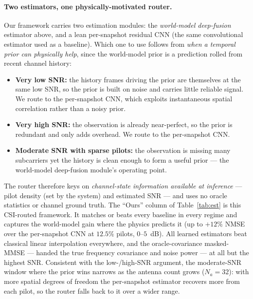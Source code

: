 \documentclass[11pt]{article}
\begin{document}
\paragraph{Two estimators, one physically-motivated router.}
Our framework carries two estimation modules: the \emph{world-model deep-fusion} estimator above, and
a lean per-snapshot residual CNN (the same convolutional estimator used as a baseline). Which one to
use follows from \emph{when a temporal prior can physically help}, since the world-model prior is a
prediction rolled from recent channel history:
\begin{itemize}[leftmargin=1.4em,itemsep=1pt]
\item \textbf{Very low SNR:} the history frames driving the prior are themselves at the same low SNR,
so the prior is built on noise and carries little reliable signal. We route to the per-snapshot CNN,
which exploits instantaneous spatial correlation rather than a noisy prior.
\item \textbf{Very high SNR:} the observation is already near-perfect, so the prior is redundant and
only adds overhead. We route to the per-snapshot CNN.
\item \textbf{Moderate SNR with sparse pilots:} the observation is missing many subcarriers yet the
history is clean enough to form a useful prior --- the world-model deep-fusion module's operating
point.
\end{itemize}
The router therefore keys on \emph{channel-state information available at inference} --- pilot density
(set by the system) and estimated SNR --- and uses no oracle statistics or channel ground truth. The
``Ours'' column of Table~\ref{tab:est} is this CSI-routed framework. It matches or beats every
baseline in every regime and captures the world-model gain where the physics predicts it (up to
$+12\%$ NMSE over the per-snapshot CNN at $12.5\%$ pilots, $0$--$5$~dB). All learned estimators beat
classical linear interpolation everywhere, and the oracle-covariance masked-MMSE --- handed the true
frequency covariance and noise power --- at all but the highest SNR. Consistent with the low-/high-SNR
argument, the moderate-SNR window where the prior wins narrows as the antenna count grows
($N_a{=}32$): with more spatial degrees of freedom the per-snapshot estimator recovers more from each
pilot, so the router falls back to it over a wider range.
\end{document}
